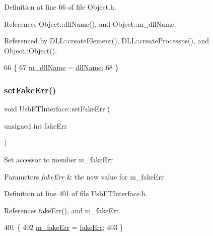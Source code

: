Definition at line 66 of file Object.\+h.



References Object\+::dll\+Name(), and Object\+::m\+\_\+dll\+Name.



Referenced by D\+L\+L\+::create\+Element(), D\+L\+L\+::create\+Processus(), and Object\+::\+Object().


\begin{DoxyCode}
66                                       \{
67     \hyperlink{classObject_a01afbeacebb8db6831559972ec362eb3}{m\_dllName} = \hyperlink{classObject_a2e3947f2870094c332d7454117f3ec63}{dllName};
68   \}
\end{DoxyCode}
\mbox{\label{classUsbFTInterface_aec057577db0b913beedf1e9896498e10}} 
\subsubsection{\texorpdfstring{set\+Fake\+Err()}{setFakeErr()}}
{\footnotesize\ttfamily void Usb\+F\+T\+Interface\+::set\+Fake\+Err (\begin{DoxyParamCaption}\item[{unsigned int}]{fake\+Err }\end{DoxyParamCaption})\hspace{0.3cm}{\ttfamily [inline]}}

Set accessor to member m\+\_\+fake\+Err 
\begin{DoxyParams}{Parameters}
{\em fake\+Err} & the new value for m\+\_\+fake\+Err \\
\hline
\end{DoxyParams}


Definition at line 401 of file Usb\+F\+T\+Interface.\+h.



References fake\+Err(), and m\+\_\+fake\+Err.


\begin{DoxyCode}
401                                          \{
402     \hyperlink{classUsbFTInterface_ab3660cba031df164b2d2df6e4c40f291}{m\_fakeErr} = \hyperlink{classUsbFTInterface_abb29c7f73506259ef57d1e25204f8f7c}{fakeErr};
403   \}
\end{DoxyCode}
\mbox{\label{classObject_a398fe08cba594a0ce6891d59fe4f159f}} 
